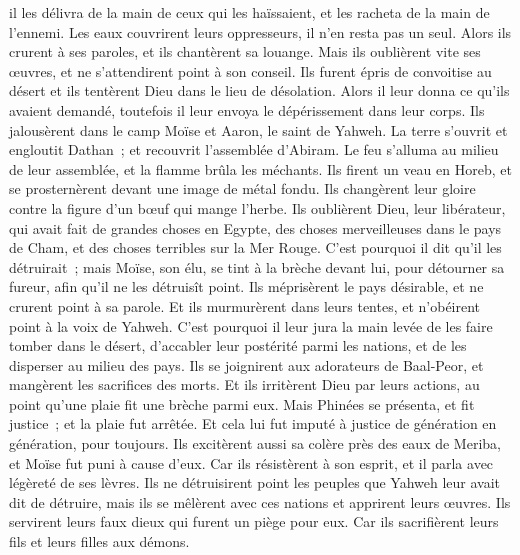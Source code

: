 \begin{multicols}{2}
il les délivra de la main de ceux qui les haïssaient, et les racheta de la main de l'ennemi.
Les eaux couvrirent leurs oppresseurs, il n'en resta pas un seul.
Alors ils crurent à ses paroles, et ils chantèrent sa louange.
Mais ils oublièrent vite ses œuvres, et ne s'attendirent point à son conseil.
Ils furent épris de convoitise au désert et ils tentèrent Dieu dans le lieu de désolation.
Alors il leur donna ce qu'ils avaient demandé, toutefois il leur envoya le dépérissement dans leur corps.
Ils jalousèrent dans le camp Moïse et Aaron, le saint de Yahweh.
La terre s'ouvrit et engloutit Dathan~; et recouvrit l'assemblée d'Abiram.
Le feu s'alluma au milieu de leur assemblée, et la flamme brûla les méchants.
Ils firent un veau en Horeb, et se prosternèrent devant une image de métal fondu.
Ils changèrent leur gloire contre la figure d'un bœuf qui mange l'herbe.
Ils oublièrent Dieu, leur libérateur, qui avait fait de grandes choses en Egypte,
des choses merveilleuses dans le pays de Cham, et des choses terribles sur la Mer Rouge.
C'est pourquoi il dit qu'il les détruirait~; mais Moïse, son élu, se tint à la brèche devant lui, pour détourner sa fureur, afin qu'il ne les détruisît point.
Ils méprisèrent le pays désirable, et ne crurent point à sa parole.
Et ils murmurèrent dans leurs tentes, et n'obéirent point à la voix de Yahweh.
C'est pourquoi il leur jura la main levée de les faire tomber dans le désert,
d'accabler leur postérité parmi les nations, et de les disperser au milieu des pays.
Ils se joignirent aux adorateurs de Baal-Peor, et mangèrent les sacrifices des morts.
Et ils irritèrent Dieu par leurs actions, au point qu'une plaie fit une brèche parmi eux.
Mais Phinées se présenta, et fit justice~; et la plaie fut arrêtée.
Et cela lui fut imputé à justice de génération en génération, pour toujours.
Ils excitèrent aussi sa colère près des eaux de Meriba, et Moïse fut puni à cause d'eux.
Car ils résistèrent à son esprit, et il parla avec légèreté de ses lèvres.
Ils ne détruisirent point les peuples que Yahweh leur avait dit de détruire,
mais ils se mêlèrent avec ces nations et apprirent leurs œuvres.
Ils servirent leurs faux dieux qui furent un piège pour eux.
Car ils sacrifièrent leurs fils et leurs filles aux démons.

\end{multicols}
